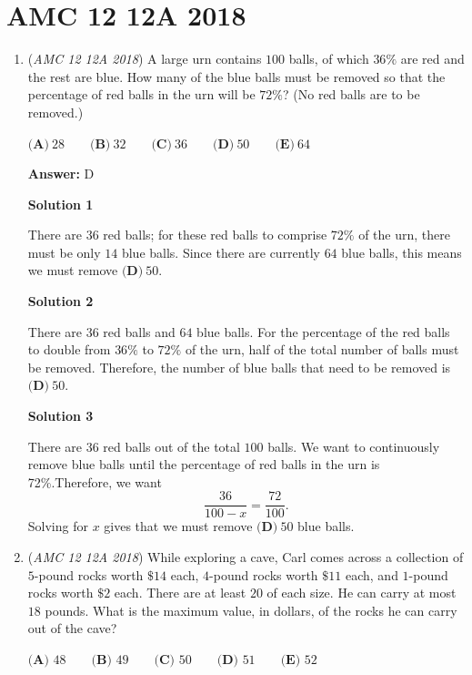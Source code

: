 \section{AMC 12 12A 2018}
        \begin{enumerate}
        	\item (\textit{AMC 12 12A 2018}) A large urn contains $100$ balls, of which $36 \%$ are red and the rest are blue. How many of the blue balls must be removed so that the percentage of red balls in the urn will be $72 \%$? (No red balls are to be removed.)


 $\textbf{(A)}\ 28 \qquad\textbf{(B)}\  32 \qquad\textbf{(C)}\  36 \qquad\textbf{(D)}\   50 \qquad\textbf{(E)}\ 64$

 \textbf{Answer: }D



\textbf{Solution 1}

There are $36$ red balls; for these red balls to comprise $72 \%$ of the urn, there must be only $14$ blue balls. Since there are currently $64$ blue balls, this means we must remove $\boxed{\textbf{(D)}\ 50}$.

 



\textbf{Solution 2}

There are $36$ red balls and $64$ blue balls. For the percentage of the red balls to double from $36 \%$ to $72 \%$ of the urn, half of the total number of balls must be removed. Therefore, the number of blue balls that need to be removed is $\boxed{\textbf{(D)}\ 50}$.

 



\textbf{Solution 3}

There are $36$ red balls out of the total $100$ balls. We want to continuously remove blue balls until the percentage of red balls in the urn is 72\%.Therefore, we want
 \[\frac{36}{100-x}=\frac{72}{100}.\]Solving for $x$ gives that we must remove $\boxed{\textbf{(D)}\ 50}$ blue balls.

 


	\item (\textit{AMC 12 12A 2018}) While exploring a cave, Carl comes across a collection of $5$-pound rocks worth $\$14$ each, $4$-pound rocks worth $\$11$ each, and $1$-pound rocks worth $\$2$ each. There are at least $20$ of each size. He can carry at most $18$ pounds. What is the maximum value, in dollars, of the rocks he can carry out of the cave?


 $\textbf{(A) } 48 \qquad \textbf{(B) } 49 \qquad \textbf{(C) } 50 \qquad \textbf{(D) } 51 \qquad \textbf{(E) } 52$


\end{enumerate}
